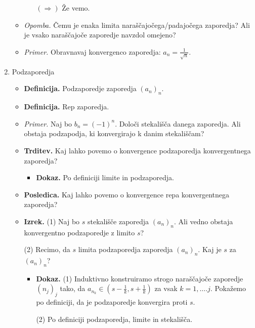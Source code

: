 \begin{enumerate}
\begin{itemize}
\begin{itemize}
            $(\Rightarrow)$ Že vemo.
        \end{itemize}
        \item \colorbox{yellow!30}{\emph{Opomba.}} Čemu je enaka limita naraščajočega/padajočega zaporedja? Ali je vsako naraščajoče zaporedje navzdol omejeno?
        \item \colorbox{yellow!30}{\emph{Primer.}} Obravnavaj konvergenco zaporedja: $a_n = \frac{1}{\sqrt{n}}$.
    \end{itemize}

    \item Podzaporedja
    \begin{itemize}
        \item \colorbox{purple!30}{\textbf{Definicija.}} Podzaporedje zaporedja $(a_n)_n$.
        \item \colorbox{purple!30}{\textbf{Definicija.}} Rep zaporedja.
        \item \colorbox{yellow!30}{\emph{Primer.}} Naj bo $b_n = (-1)^n$. Določi stekališča danega zaporedja. Ali obstaja podzapodja, ki konvergirajo k danim stekališčam?
        \item \colorbox{blue!30}{\textbf{Trditev.}}  Kaj lahko povemo o konvergence podzaporedja konvergentnega zaporedja?
        \begin{itemize}
            \item \colorbox{green!30}{\textbf{Dokaz.}} Po definiciji limite in podzaporedja.
        \end{itemize}
        \item \colorbox{orange!30}{\textbf{Posledica.}} Kaj lahko povemo o konvergence repa konvergentnega zaporedja?
        \item \colorbox{blue!30}{\textbf{Izrek.}} (1) Naj bo $s$ stekališče zaporedja $(a_n)_n$. Ali vedno obstaja konvergentno podzaporedje z limito $s$?
        
        (2) Recimo, da $s$ limita podzaporedja zaporedja $(a_n)_n$. Kaj je $s$ za $(a_n)_n$?
        \begin{itemize}
            \item  \colorbox{green!30}{\textbf{Dokaz.}} (1) Induktivno konstruiramo strogo naraščajoče zaporedje $(n_j)_j$ tako, da $a_{n_k} \in (s - \frac{1}{k}, s + \frac{1}{k})$ za vsak $k = 1, \ldots. j$. Pokažemo po definiciji, da je podzaporedje konvergira proti $s$. 
            
            (2) Po definiciji podzaporedja, limite in stekališča.
            
        \end{itemize}
    \end{itemize}


\end{enumerate}
